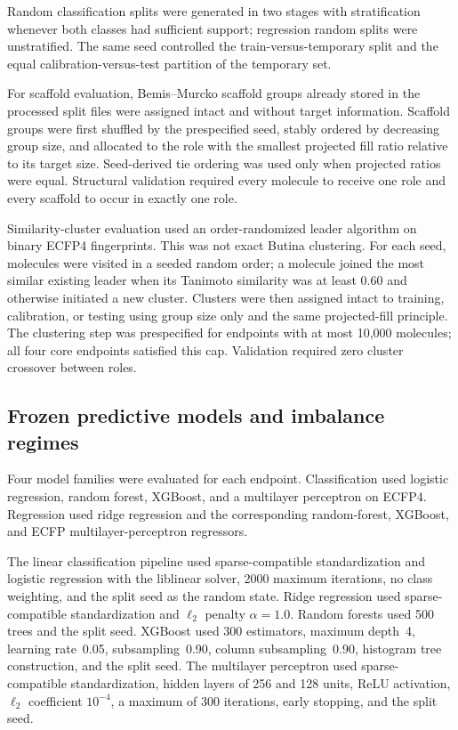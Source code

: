 Random classification splits were generated in two stages with stratification whenever both classes had sufficient support; regression random splits were unstratified. The same seed controlled the train-versus-temporary split and the equal calibration-versus-test partition of the temporary set.

For scaffold evaluation, Bemis--Murcko scaffold groups already stored in the processed split files were assigned intact and without target information. Scaffold groups were first shuffled by the prespecified seed, stably ordered by decreasing group size, and allocated to the role with the smallest projected fill ratio relative to its target size. Seed-derived tie ordering was used only when projected ratios were equal. Structural validation required every molecule to receive one role and every scaffold to occur in exactly one role.

Similarity-cluster evaluation used an order-randomized leader algorithm on binary ECFP4 fingerprints. This was not exact Butina clustering. For each seed, molecules were visited in a seeded random order; a molecule joined the most similar existing leader when its Tanimoto similarity was at least 0.60 and otherwise initiated a new cluster. Clusters were then assigned intact to training, calibration, or testing using group size only and the same projected-fill principle. The clustering step was prespecified for endpoints with at most 10,000 molecules; all four core endpoints satisfied this cap. Validation required zero cluster crossover between roles.

\subsection{Frozen predictive models and imbalance regimes}

Four model families were evaluated for each endpoint. Classification used logistic regression, random forest, XGBoost, and a multilayer perceptron on ECFP4. Regression used ridge regression and the corresponding random-forest, XGBoost, and ECFP multilayer-perceptron regressors.

The linear classification pipeline used sparse-compatible standardization and logistic regression with the liblinear solver, 2000 maximum iterations, no class weighting, and the split seed as the random state. Ridge regression used sparse-compatible standardization and $\ell_2$ penalty $\alpha=1.0$. Random forests used 500 trees and the split seed. XGBoost used 300 estimators, maximum depth~4, learning rate~0.05, subsampling~0.90, column subsampling~0.90, histogram tree construction, and the split seed. The multilayer perceptron used sparse-compatible standardization, hidden layers of 256 and 128 units, ReLU activation, $\ell_2$ coefficient $10^{-4}$, a maximum of 300 iterations, early stopping, and the split seed.

